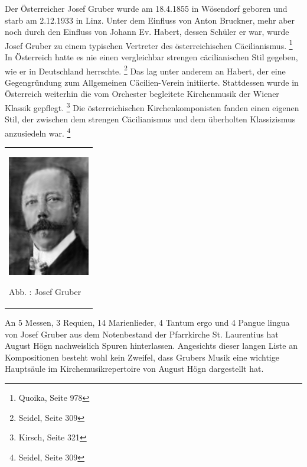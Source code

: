 Der Österreicher Josef Gruber wurde am 18.4.1855 in Wösendorf geboren
und starb am 2.12.1933 in Linz. Unter dem Einfluss von Anton Bruckner,
mehr aber noch durch den Einfluss von Johann Ev. Habert, dessen Schüler
er war, wurde Josef Gruber zu einem typischen Vertreter des
österreichischen Cäcilianismus. \footnote{Quoika, Seite 978} In
Österreich hatte es nie einen vergleichbar strengen cäcilianischen Stil
gegeben, wie er in Deutschland herrschte. \footnote{Seidel, Seite 309}
Das lag unter anderem an Habert, der eine Gegengründung zum Allgemeinen
Cäcilien-Verein initiierte. Stattdessen wurde in Österreich weiterhin
die vom Orchester begleitete Kirchenmusik der Wiener Klassik
gepflegt. \footnote{Kirsch, Seite 321} Die österreichischen
Kirchenkomponisten fanden einen eigenen Stil, der zwischen dem strengen
Cäcilianismus und dem überholten Klassizismus anzusiedeln
war. \footnote{Seidel, Seite 309}

\begin{center}
\begin{minipage}{3.953cm}
\begin{flushleft}
\tablefirsthead{}
\tablehead{}
\tabletail{}
\tablelasttail{}
\begin{supertabular}{m{3.753cm}}

\includegraphics[width=3.57cm,height=5.276cm]{pictures/zulassungsarbeit-img093.jpg}

Abb. : Josef Gruber\\
\end{supertabular}
\end{flushleft}
\end{minipage}
\end{center}
An 5 Messen, 3 Requien, 14 Marienlieder, 4 Tantum ergo und 4 Pangue
lingua von Josef Gruber aus dem Notenbestand der Pfarrkirche St.
Laurentius hat August Högn nachweislich Spuren hinterlassen. Angesichts
dieser langen Liste an Kompositionen besteht wohl kein Zweifel, dass
Grubers Musik eine wichtige Hauptsäule im Kirchemusikrepertoire von
August Högn dargestellt hat.

